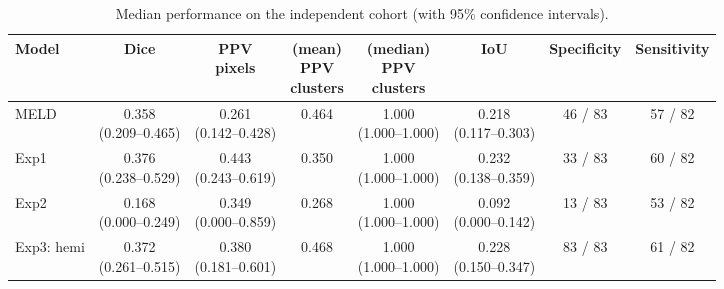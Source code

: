 \documentclass[a4paper,12pt]{article}
\begin{document}
\begin{table}[ht]
\tiny
\begin{threeparttable}
\centering
\caption{Median performance on the independent cohort (with 95\% confidence intervals).} 
\label{tab:independent_cohort}
\begin{tabular}{lccccccc}
\textbf{Model} &
\textbf{Dice} &
\makecell{\textbf{PPV}\\\textbf{pixels}} &
\makecell{\textbf{(mean)} \\\textbf{PPV}\\\textbf{clusters}} & \makecell{\textbf{(median)}\\\textbf{PPV}\\\textbf{clusters}} & 
\textbf{IoU} & 
\textbf{Specificity} &
\textbf{Sensitivity} \\
\midrule
MELD &
\makecell{0.358\\(0.209--0.465)} &
\makecell{0.261\\(0.142--0.428)} &
\colorbox{orange!20}{0.464} &
\makecell{1.000\\(1.000--1.000)} &
\makecell{0.218\\(0.117--0.303)} &
46 / 83 & 
57 / 82 \\

Exp1 &
\makecell{\colorbox{blue!20}{0.376}\\(0.238--0.529)} &
\makecell{0.443\\(0.243--0.619)} &
0.350 &
\makecell{1.000\\(1.000--1.000)} &
\makecell{\colorbox{blue!20}{0.232}\\(0.138--0.359)} &
33 / 83 &
60 / 82 \\

Exp2  &
\makecell{0.168\\\colorbox{red!20}{(0.000--0.249)}} &
\makecell{0.349\\\colorbox{red!20}{(0.000--0.859)}} &
0.268 &
\makecell{1.000\\(1.000--1.000)} &
\makecell{0.092\\\colorbox{red!20}{(0.000--0.142)}} &
13 / 83 &
53 / 82 \\

Exp3: hemi  &
\makecell{0.372\\(0.261--0.515)} &
\makecell{0.380\\(0.181--0.601)} &
\colorbox{blue!20}{0.468} &
\makecell{1.000\\(1.000--1.000)} &
\makecell{0.228\\(0.150--0.347)} &
\colorbox{green!20}{83 / 83} &
61 / 82 \\


\end{tabular}
\end{threeparttable}
\end{table}
\end{document}
